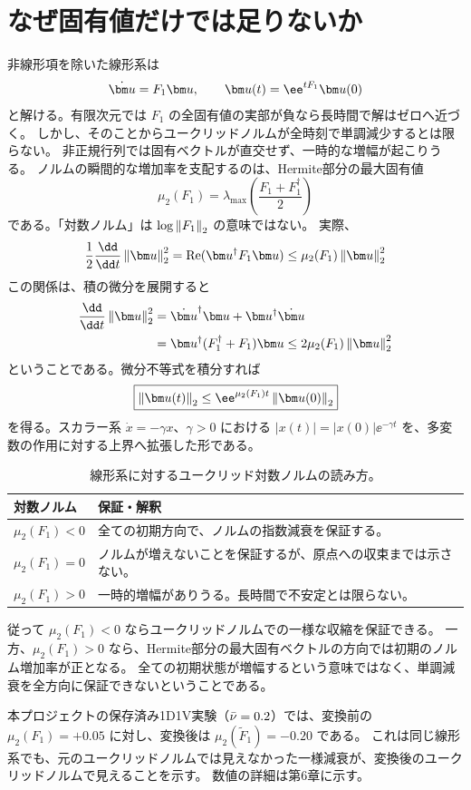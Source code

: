 \section{なぜ固有値だけでは足りないか}
非線形項を除いた線形系は
\[
\dot\uu=F_1\uu,\qquad \uu(t)=\ee^{tF_1}\uu(0)
\]
と解ける。有限次元では $F_1$ の全固有値の実部が負なら長時間で解はゼロへ近づく。
しかし、そのことからユークリッドノルムが全時刻で単調減少するとは限らない。
非正規行列では固有ベクトルが直交せず、一時的な増幅が起こりうる。
ノルムの瞬間的な増加率を支配するのは、Hermite部分の最大固有値
\begin{equation}
\mu_2(F_1)=\lambda_{\max}\left(\frac{F_1+F_1^\dagger}{2}\right)
\label{eq:lognorm}
\end{equation}
である。「対数ノルム」は $\log\left\lVert F_1\right\rVert_2$ の意味ではない。
実際、
\[
\frac12\frac{\dd}{\dd t}\normtwo{\uu}^2
=\operatorname{Re}(\uu^\dagger F_1\uu)
\leq\mu_2(F_1)\normtwo{\uu}^2
\]
この関係は、積の微分を展開すると
\begin{align*}
\frac{\dd}{\dd t}\normtwo{\uu}^2
&=\dot\uu^\dagger\uu+\uu^\dagger\dot\uu\\
&=\uu^\dagger(F_1^\dagger+F_1)\uu
\leq2\mu_2(F_1)\normtwo{\uu}^2
\end{align*}
ということである。微分不等式を積分すれば
\[
\boxed{\normtwo{\uu(t)}\leq\ee^{\mu_2(F_1)t}\normtwo{\uu(0)}}
\]
を得る。スカラー系 $\dot x=-\gamma x$、$\gamma>0$ における
$|x(t)|=|x(0)|\ee^{-\gamma t}$ を、多変数の作用に対する上界へ拡張した形である。
\begin{table}[htbp]
\centering\small
\caption{線形系に対するユークリッド対数ノルムの読み方。}
\begin{tabularx}{\textwidth}{lX}
\toprule 対数ノルム & 保証・解釈 \\\midrule
$\mu_2(F_1)<0$ & 全ての初期方向で、ノルムの指数減衰を保証する。\\
$\mu_2(F_1)=0$ & ノルムが増えないことを保証するが、原点への収束までは示さない。\\
$\mu_2(F_1)>0$ & 一時的増幅がありうる。長時間で不安定とは限らない。\\
\bottomrule
\end{tabularx}
\end{table}
従って $\mu_2(F_1)<0$ ならユークリッドノルムでの一様な収縮を保証できる。
一方、$\mu_2(F_1)>0$ なら、Hermite部分の最大固有ベクトルの方向では初期のノルム増加率が正となる。
全ての初期状態が増幅するという意味ではなく、単調減衰を全方向に保証できないということである。

本プロジェクトの保存済み1D1V実験（$\bar\nu=0.2$）では、変換前の $\mu_2(F_1)=+0.05$ に対し、変換後は $\mu_2(\widetilde F_1)=-0.20$ である。
これは同じ線形系でも、元のユークリッドノルムでは見えなかった一様減衰が、変換後のユークリッドノルムで見えることを示す。
数値の詳細は第6章に示す。


